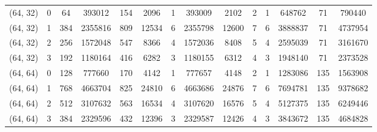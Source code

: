 \begin{tabular}{|c|c||c|c|c|c|c|c|c|c||c|c|c|c|}
 (64, 32) &          0 &  64 &  393012 & 154 &  2096 & 1 &  393009 &  2102 &  2 &                 1 &  648762 &     71 &      790440 \\
 (64, 32) &          1 & 384 & 2355816 & 809 & 12534 & 6 & 2355798 & 12600 &  7 &                 6 & 3888837 &     71 &     4737954 \\
 (64, 32) &          2 & 256 & 1572048 & 547 &  8366 & 4 & 1572036 &  8408 &  5 &                 4 & 2595039 &     71 &     3161670 \\
 (64, 32) &          3 & 192 & 1180164 & 416 &  6282 & 3 & 1180155 &  6312 &  4 &                 3 & 1948140 &     71 &     2373528 \\
 (64, 64) &          0 & 128 &  777660 & 170 &  4142 & 1 &  777657 &  4148 &  2 &                 1 & 1283086 &    135 &     1563908 \\
 (64, 64) &          1 & 768 & 4663704 & 825 & 24810 & 6 & 4663686 & 24876 &  7 &                 6 & 7694781 &    135 &     9378682 \\
 (64, 64) &          2 & 512 & 3107632 & 563 & 16534 & 4 & 3107620 & 16576 &  5 &                 4 & 5127375 &    135 &     6249446 \\
 (64, 64) &          3 & 384 & 2329596 & 432 & 12396 & 3 & 2329587 & 12426 &  4 &                 3 & 3843672 &    135 &     4684828 \\
\bottomrule
\end{tabular}

